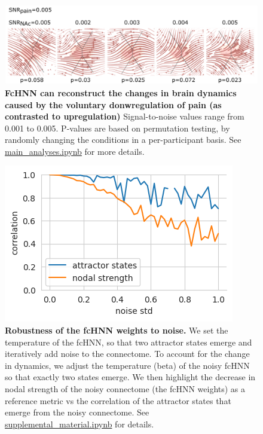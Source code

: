 \documentclass{article}
\begin{document}
\begin{figure}[!htbp]
\centering
\includegraphics[width=0.7\linewidth]{files/si_downreg_trajector-db045816ed9fc049c108644c20f908bf.png}
\caption[]{\textbf{FcHNN can reconstruct the changes in brain dynamics caused by the voluntary donwregulation of pain (as contrasted to upregulation)}
Signal-to-noise values range from 0.001 to 0.005. P-values are based on permutation testing, by randomly changing the conditions in a per-participant basis. See \href{https://github.com/pni-lab/connattractor/blob/master/notebooks/main\_analyses.ipynb}{main\_analyses.ipynb} for more details.}
\label{si_downreg_trajectory_sim}
\end{figure}

\begin{figure}[!htbp]
\centering
\includegraphics[width=0.7\linewidth]{files/noise_robustness_wei-563b05a15c067a7db08d7759123cc5c2.png}
\caption[]{\textbf{Robustness of the fcHNN weights to noise.}
We set the temperature of the fcHNN, so that two attractor states emerge and iteratively add noise to the connectome.
To account for the change in dynamics, we adjust the temperature (beta) of the noisy fcHNN so that exactly two states emerge. We then highlight the decrease in nodal strength of the noisy connectome (the fcHNN weights) as a reference metric
vs the correlation of the attractor states that emerge from the noisy connectome. See \href{https://github.com/pni-lab/connattractor/blob/master/notebooks/supplemental\_material.ipynb}{supplemental\_material.ipynb} for details.}
\label{si_noise_robustness_weights}
\end{figure}
\end{document}
